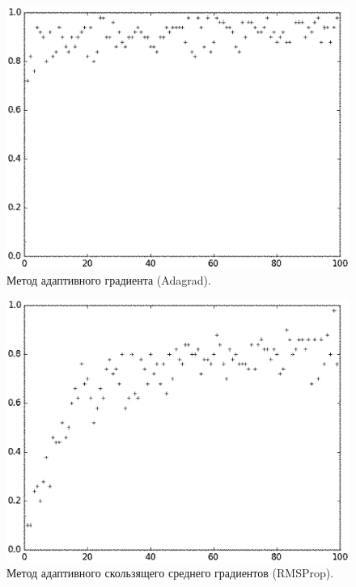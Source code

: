 \documentclass[oneside,final,14pt]{extreport}
\begin{document}
\begin{figure}
    \centering
    \includegraphics[width=1.0\textwidth]{Adagrad.eps}
    \caption{Метод адаптивного градиента (Adagrad).}
    \label{fig:Adagrad}
\end{figure}
 
\begin{figure}
    \centering
    \includegraphics[width=1.0\textwidth]{RMSProp.eps}
    \caption{Метод адаптивного скользящего среднего градиентов (RMSProp).}
    \label{fig:RMSProp}
\end{figure}
 
\end{document}
